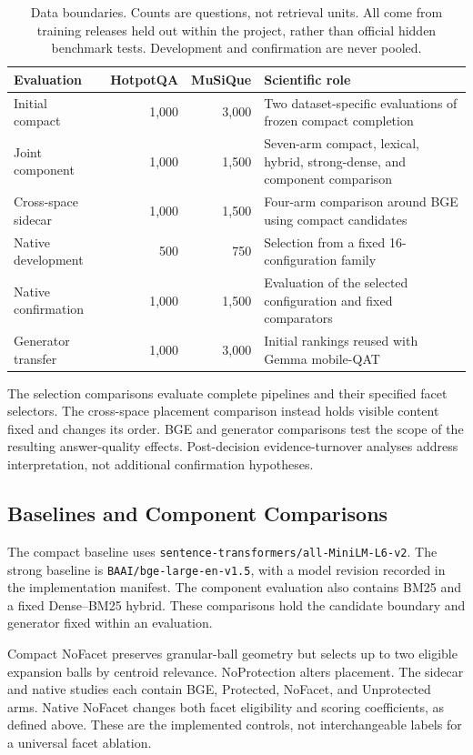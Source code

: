 \documentclass[11pt,a4paper]{article}
\begin{document}
\begin{table}[t]
\centering\small
\begin{tabular}{@{}p{}rrp{}@{}}
\toprule
Evaluation & HotpotQA & MuSiQue & Scientific role\\
\midrule
Initial compact & 1,000 & 3,000 & Two dataset-specific evaluations of frozen compact completion\\
Joint component & 1,000 & 1,500 & Seven-arm compact, lexical, hybrid, strong-dense, and component comparison\\
Cross-space sidecar & 1,000 & 1,500 & Four-arm comparison around BGE using compact candidates\\
Native development & 500 & 750 & Selection from a fixed 16-configuration family\\
Native confirmation & 1,000 & 1,500 & Evaluation of the selected configuration and fixed comparators\\
Generator transfer & 1,000 & 3,000 & Initial rankings reused with Gemma mobile-QAT\\
\bottomrule
\end{tabular}
\caption{Data boundaries. Counts are questions, not retrieval units. All come
from training releases held out within the project, rather than official hidden
benchmark tests. Development and confirmation are never pooled.}
\label{tab:boundaries}
\end{table}

The selection comparisons evaluate complete pipelines and their specified
facet selectors. The cross-space placement comparison instead holds visible
content fixed and changes its order. BGE and generator comparisons test the
scope of the resulting answer-quality effects.
Post-decision evidence-turnover analyses address interpretation, not additional
confirmation hypotheses.

\subsection{Baselines and Component Comparisons}
The compact baseline uses \texttt{sentence-transformers/all-MiniLM-L6-v2}.
The strong baseline is \texttt{BAAI/bge-large-en-v1.5}, with a model revision
recorded in the implementation manifest. The component evaluation also
contains BM25 and a fixed Dense--BM25 hybrid. These comparisons hold the
candidate boundary and generator fixed within an evaluation.

Compact NoFacet preserves granular-ball geometry but selects up to two
eligible expansion balls by centroid relevance. NoProtection alters placement.
The sidecar and native studies each contain BGE, Protected, NoFacet, and
Unprotected arms. Native NoFacet changes both facet eligibility and scoring
coefficients, as defined above. These are the implemented controls, not
interchangeable labels for a universal facet ablation.
\end{document}
